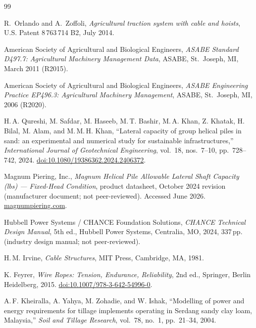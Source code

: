 \documentclass[11pt,a4paper]{article}
\begin{document}
\begin{thebibliography}{99}\setlength{\itemsep}{0.18em}

R.~Orlando and A.~Zoffoli,
\emph{Agricultural traction system with cable and hoists},
U.S. Patent 8\,763\,714 B2, July 2014.

American Society of Agricultural and Biological Engineers,
\emph{ASABE Standard D497.7: Agricultural Machinery Management Data},
ASABE, St.\ Joseph, MI, March 2011 (R2015).

American Society of Agricultural and Biological Engineers,
\emph{ASABE Engineering Practice EP496.3: Agricultural Machinery Management},
ASABE, St.\ Joseph, MI, 2006 (R2020).

H.\,A. Qureshi, M. Safdar, M. Haseeb, M.\,T. Bashir, M.\,A. Khan, Z. Khatak, H. Bilal, M. Alam, and M.\,M.\,H. Khan,
``Lateral capacity of group helical piles in sand: an experimental and numerical study for sustainable infrastructures,''
\emph{International Journal of Geotechnical Engineering}, vol.~18, nos.~7--10, pp.~728--742, 2024.
\href{https://doi.org/10.1080/19386362.2024.2406372}{doi:10.1080/19386362.2024.2406372}.

Magnum Piering, Inc.,
\emph{Magnum Helical Pile Allowable Lateral Shaft Capacity (lbs) --- Fixed-Head Condition},
product datasheet, October 2024 revision (manufacturer document; not peer-reviewed). Accessed June 2026.
\href{https://magnumpiering.com/wp-content/uploads/2024/10/Lateral\%20Shaft\%20Capacity\%20Fixed.pdf}{magnumpiering.com}.

Hubbell Power Systems / CHANCE Foundation Solutions,
\emph{CHANCE Technical Design Manual}, 5th ed.,
Hubbell Power Systems, Centralia, MO, 2024, 337\,pp. (industry design manual; not peer-reviewed).

H.\,M. Irvine,
\emph{Cable Structures},
MIT Press, Cambridge, MA, 1981.

K. Feyrer,
\emph{Wire Ropes: Tension, Endurance, Reliability}, 2nd ed.,
Springer, Berlin Heidelberg, 2015.
\href{https://doi.org/10.1007/978-3-642-54996-0}{doi:10.1007/978-3-642-54996-0}.

A.\,F. Kheiralla, A. Yahya, M. Zohadie, and W. Ishak,
``Modelling of power and energy requirements for tillage implements operating in Serdang sandy clay loam, Malaysia,''
\emph{Soil and Tillage Research}, vol.~78, no.~1, pp.~21--34, 2004.


\end{thebibliography}
\end{document}
